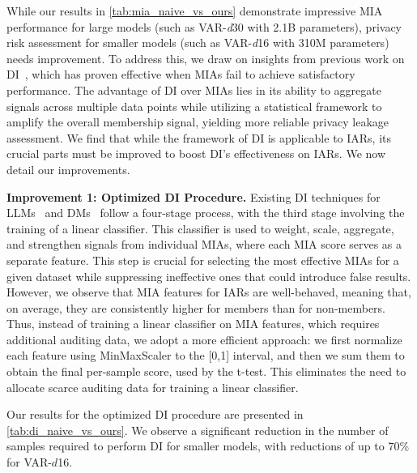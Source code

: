 While our results in \cref{tab:mia_naive_vs_ours} demonstrate impressive MIA performance for large models (such as VAR-\textit{d}30 with 2.1B parameters), privacy risk assessment for smaller models (such as VAR-\textit{d}16 with 310M parameters) needs improvement. To address this, we draw on insights from previous work on DI~\citep{maini2024llmdatasetinferencedid,dubinski2024cdicopyrighteddataidentification}, which has proven effective when MIAs fail to achieve satisfactory performance. The advantage of DI over MIAs lies in its ability to aggregate signals across multiple data points while utilizing a statistical framework to amplify the overall membership signal, yielding more reliable privacy leakage assessment. We find that while the framework of DI is applicable to IARs, its crucial parts must be improved to boost DI's effectiveness on IARs. We now detail our improvements.
















\textbf{Improvement 1: Optimized DI Procedure.} Existing DI techniques for LLMs~\citep{maini2024llmdatasetinferencedid} and DMs~\citep{dubinski2024cdicopyrighteddataidentification} follow a four-stage process, with the third stage involving the training of a linear classifier. This classifier is used to weight, scale, aggregate, and strengthen signals from individual MIAs, where each MIA score serves as a separate feature. This step is crucial for selecting the most effective MIAs for a given dataset while suppressing ineffective ones that could introduce false results. However, we observe that MIA features for IARs are well-behaved, meaning that, on average, they are consistently higher for members than for non-members. Thus, instead of training a linear classifier on MIA features, which requires additional auditing data, we adopt a more efficient approach: we first normalize each feature using MinMaxScaler to the [0,1] interval, and then we sum them to obtain the final per-sample score, used by the t-test. This eliminates the need to allocate scarce auditing data for training a linear classifier.


Our results for the optimized DI procedure are presented in \cref{tab:di_naive_vs_ours}. We observe a significant reduction in the number of samples required to perform DI for smaller models, with reductions of up to 70\% for VAR-$\mathit{d}$16. 








